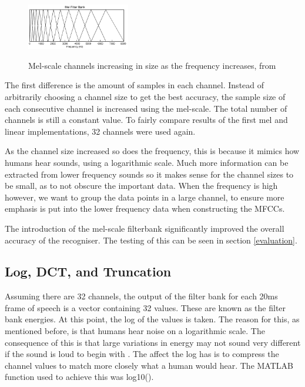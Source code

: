 \documentclass[journal]{IEEEtran}
\begin{document}
\begin{figure}[!htb]
	\centering
	\captionsetup{justification=centering}
	\includegraphics[width=0.4\textwidth]{mel.jpg}\\
	\caption{Mel-scale channels increasing in size as the frequency increases, from \cite{melpic}}\label{fig:mel}
\end{figure}

The first difference is the amount of samples in each channel. Instead of arbitrarily choosing a channel size to get the best accuracy, the sample size of each consecutive channel is increased using the mel-scale. The total number of channels is still a constant value. To fairly compare results of the first mel and linear implementations, 32 channels were used again.

As the channel size increased so does the frequency, this is because it mimics how humans hear sounds, using a logarithmic scale. Much more information can be extracted from lower frequency sounds so it makes sense for the channel sizes to be small, as to not obscure the important data. When the frequency is high however, we want to group the data points in a large channel, to ensure more emphasis is put into the lower frequency data when constructing the MFCCs.

The introduction of the mel-scale filterbank significantly improved the overall accuracy of the recogniser. The testing of this can be seen in section \ref{evaluation}.

\subsection{Log, DCT, and Truncation}
Assuming there are 32 channels, the output of the filter bank for each 20ms frame of speech is a vector containing 32 values. These are known as the filter bank energies. At this point, the log of the values is taken. The reason for this, as mentioned before, is that humans hear noise on a logarithmic scale. The consequence of this is that large variations in energy may not sound very different if the sound is loud to begin with \cite{melpic}. The affect the log has is to compress the channel values to match more closely what a human would hear. The MATLAB function used to achieve this was {\selectfont log10()}.
\end{document}
